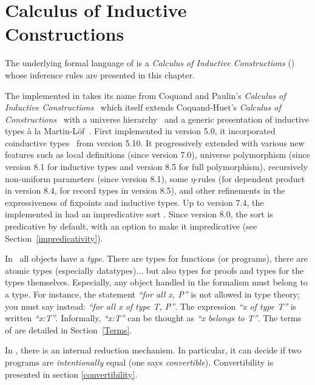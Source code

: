 \chapter[Calculus of Inductive Constructions]{Calculus of Inductive Constructions
\label{Cic}
}

The underlying formal language of {\Coq} is a {\em Calculus of
  Inductive Constructions} (\CIC) whose inference rules are presented in
this chapter.

The {\CIC} implemented in {\Coq}
takes its name from Coquand and Paulin's {\em Calculus of
  Inductive Constructions}~\cite{CoPa89} which itself extends
Coquand-Huet's {\em Calculus of
  Constructions}~\cite{CoHu85a,CoHu85b,CoHu86,Coq85} with a universe
hierarchy~\cite{Coq86,Luo90,Hue88b} and a generic presentation of
inductive types à la Martin-L\"of~\cite{MaL84,Dyb91}. First implemented in
{\Coq} version 5.0, it incorporated coinductive
types~\cite{Coquand93,Gim96} from {\Coq} version 5.10. It
progressively extended with various new features such as local
definitions (since {\Coq} version 7.0), universe polymorphism (since
{\Coq} version 8.1 for inductive types and version 8.5 for full
polymorphism), recursively non-uniform parameters (since {\Coq} version 8.1),
some $\eta$-rules (for dependent product in {\Coq}
version 8.4, for record types in {\Coq} version 8.5), and other
refinements in the expressiveness of fixpoints and inductive types.
Up to version 7.4, the {\CIC} implemented in {\Coq}
had an impredicative sort {\Set}. Since {\Coq} version 8.0, the sort
{\Set} is predicative by default, with an option to make it
impredicative (see Section~\ref{impredicativity}).

In \CIC\, all objects have a {\em type}. There are types for functions (or
programs), there are atomic types (especially datatypes)... but also
types for proofs and types for the types themselves.
Especially, any object handled in the formalism must belong to a
type.  For instance, the statement {\it ``for all x, P''} is not
allowed in type theory; you must say instead: {\it ``for all x
of type T, P''}. The expression {\it ``x of type T''} is
written {\it ``x:T''}. Informally, {\it ``x:T''} can be thought as
{\it ``x belongs to T''}.
The terms of {\CIC} are detailed in Section~\ref{Terms}.

In \CIC, there is an internal reduction mechanism. In particular, it
can decide if two programs are {\em intentionally} equal (one
says {\em convertible}). Convertibility is presented in section 
\ref{convertibility}.

